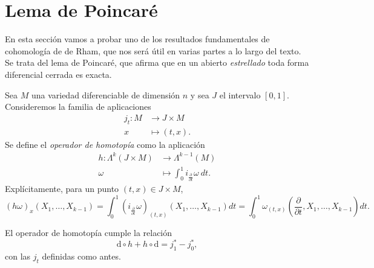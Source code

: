   \section{Lema de Poincaré}
  En esta sección vamos a probar uno de los resultados fundamentales de cohomología de de Rham, que nos será útil en varias partes a lo largo del texto. Se trata del lema de Poincaré, que afirma que en un abierto \emph{estrellado} toda forma diferencial cerrada es exacta.

  Sea $M$ una variedad diferenciable de dimensión $n$ y sea $J$ el intervalo $[0,1]$. Consideremos la familia de aplicaciones
\begin{align*}
  j_t :M&\longrightarrow J\times M\\ 
    x &\longmapsto (t,x). 
  \end{align*}
  Se define el \emph{operador de homotopía} como la aplicación
  \begin{align*}
    h :\varLambda^k(J\times M)&\longrightarrow \varLambda^{k-1}(M)\\ 
    \omega &\longmapsto \int_{0}^1 i_{\frac{\partial}{\partial t}}\omega\ dt. 
    \end{align*}
    Explícitamente, para un punto $(t,x)\in J\times M$,
    \begin{equation*}
      (h\omega)_{x }(X_1,\dots,X_{k-1})=\int_{0}^1 (i_{\frac{\partial}{\partial t}}\omega)_{(t,x)}(X_1,\dots,X_{k-1}) dt=\int_{0}^1 \omega_{(t,x)}\left(\frac{\partial}{\partial t},X_1,\dots,X_{k-1}\right) dt.
    \end{equation*}

    \begin{center}
    \end{center}

    \begin{prop}
      El operador de homotopía cumple la relación
      \begin{equation*}
	\mathrm{d} \circ h + h \circ \mathrm{d} = j_1^* - j_0^*,
      \end{equation*}
      con las $j_t$ definidas como antes.
    \end{prop}
    

